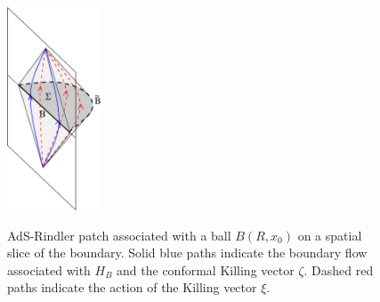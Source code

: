 \documentclass[12pt,epsf]{article}
\begin{document}
\begin{figure}
\centering
\includegraphics[width=0.25\textwidth]{hyperbolic2.eps}\\
\caption{AdS-Rindler patch associated with a ball $B(R, x_0)$ on a spatial slice of the boundary. Solid blue paths indicate the boundary flow associated with $H_B$ and the conformal Killing vector $\zeta$. Dashed red paths indicate the action of the Killing vector $\xi$.}
\label{hyperbolic2}
\end{figure}
\end{document}
